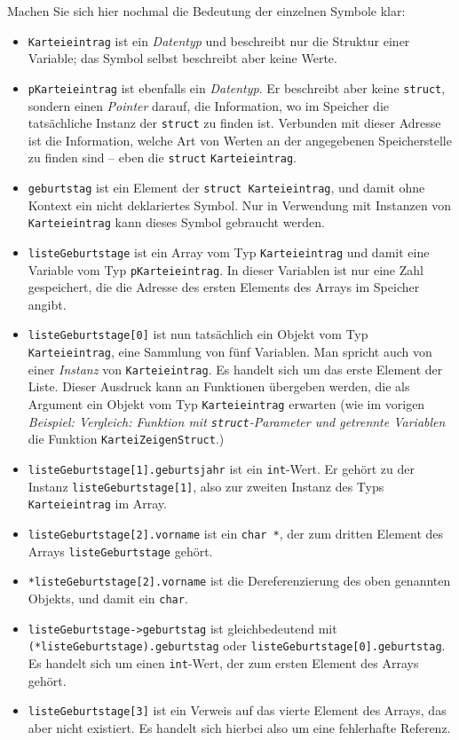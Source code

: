 Machen Sie sich hier nochmal die Bedeutung der einzelnen Symbole klar:
\begin{itemize}
\item \texttt{Karteieintrag} ist ein \emph{Datentyp} und beschreibt nur die Struktur einer Variable; das
	Symbol selbst beschreibt aber keine Werte.
\item \texttt{pKarteieintrag} ist ebenfalls ein \emph{Datentyp}. Er beschreibt aber keine
	\texttt{struct}, sondern einen \emph{Pointer} darauf, \ie die Information, wo im Speicher die
	tatsächliche Instanz der \texttt{struct} zu finden ist. Verbunden mit dieser Adresse ist die
	Information,  welche Art von Werten an der angegebenen Speicherstelle zu finden sind -- eben die
	\texttt{struct} \texttt{Karteieintrag}.
\item \texttt{geburtstag} ist ein Element der \texttt{struct Karteieintrag}, und damit ohne
	Kontext ein nicht deklariertes Symbol. Nur in Verwendung mit Instanzen von \texttt{Karteieintrag}
	kann dieses Symbol gebraucht werden.
\item \texttt{listeGeburtstage} ist ein Array vom Typ \texttt{Karteieintrag} und damit eine Variable vom
	Typ \texttt{pKarteieintrag}. In dieser Variablen ist nur eine Zahl gespeichert, die die Adresse des
	ersten Elements des Arrays im Speicher angibt.
\item \texttt{listeGeburtstage[0]} ist nun tatsächlich ein Objekt vom Typ \texttt{Karteieintrag}, \ie
	eine Sammlung von fünf Variablen. Man spricht auch von einer \emph{Instanz} von
	\texttt{Karteieintrag}. Es handelt sich um das erste Element der Liste. Dieser Ausdruck kann \eg an
	Funktionen übergeben werden, die als Argument ein Objekt vom Typ \texttt{Karteieintrag} erwarten
	(wie im vorigen \emph{Beispiel: Vergleich: Funktion mit \texttt{struct}-Parameter und getrennte
	 Variablen} die Funktion \texttt{KarteiZeigenStruct}.)
\item \texttt{listeGeburtstage[1].geburtsjahr} ist ein \texttt{int}-Wert. Er gehört zu der
	Instanz 	\texttt{listeGeburtstage[1]}, also zur zweiten Instanz des Typs \texttt{Karteieintrag} im
	Array.
\item \texttt{listeGeburtstage[2].vorname} ist ein \texttt{char *}, der zum dritten Element des Arrays
	\texttt{listeGeburtstage} gehört.
\item \texttt{*listeGeburtstage[2].vorname} ist die Dereferenzierung des oben genannten Objekts, und
	damit ein \texttt{char}.
\item \texttt{listeGeburtstage->geburtstag} ist gleichbedeutend mit
	\texttt{(*listeGeburtstage).geburtstag} oder \texttt{listeGeburtstage[0].geburtstag}. Es handelt
	sich um einen \texttt{int}-Wert, der zum ersten Element des Arrays gehört.
\item \texttt{listeGeburtstage[3]} ist ein Verweis auf das vierte Element des Arrays, das aber nicht
	existiert. Es handelt sich hierbei also um eine fehlerhafte Referenz.
\end{itemize}

